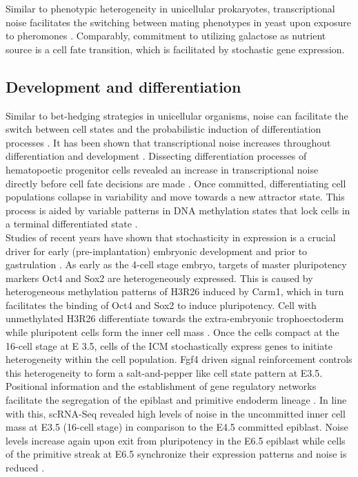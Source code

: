 Similar to phenotypic heterogeneity in unicellular prokaryotes, transcriptional noise facilitates the switching between mating phenotypes in yeast upon exposure to pheromones \citep{Paliwal2007}. Comparably, commitment to utilizing galactose as nutrient source is a cell fate transition, which is facilitated by stochastic gene expression\cite{Acar2008}. \\ 

\newpage

\subsection{Development and differentiation}

Similar to bet-hedging strategies in unicellular organisms, noise can facilitate the switch between cell states and the probabilistic induction of differentiation processes \citep{Eldar2010, Chang2008}. It has been shown that transcriptional noise increases throughout differentiation \citep{Stumpf2017} and development \citep{Antolovic2017}. Dissecting differentiation processes of hematopoetic progenitor cells revealed an increase in transcriptional noise directly before cell fate decisions are made \citep{Mojtahedi2016, Richard2016}. Once committed, differentiating cell populations collapse in variability and move towards a new attractor state. This process is aided by variable patterns in DNA methylation states that lock cells in a terminal differentiated state \citep{Jenkinson2017}. \\

Studies of recent years have shown that stochasticity in expression is a crucial driver for early (pre-implantation) embryonic development and prior to gastrulation \citep{Dietrich2007}. As early as the 4-cell stage embryo, targets of master pluripotency markers \Gls{Oct4} and \Gls{Sox2} are heterogeneously expressed.  This is caused by heterogeneous methylation patterns of \Gls{H3R26} induced by \Gls{Carm1}, which in turn facilitates the binding of Oct4 and Sox2 to induce pluripotency. Cell with unmethylated H3R26 differentiate towards the extra-embryonic trophoectoderm while pluripotent cells form the inner cell mass \citep{Goolam2016}. Once the cells compact at the 16-cell stage at \Gls{E} 3.5, cells of the \gls{ICM} stochastically express genes to initiate heterogeneity within the cell population. Fgf4 driven signal reinforcement controls this heterogeneity to form a salt-and-pepper like cell state pattern at E3.5. Positional information and the establishment of gene regulatory networks facilitate the segregation of the epiblast and primitive endoderm lineage \citep{Ohnishi2014}. In line with this, scRNA-Seq revealed high levels of noise in the uncommitted inner cell mass at E3.5 (16-cell stage) in comparison to the E4.5 committed epiblast. Noise levels increase again upon exit from pluripotency in the E6.5 epiblast while cells of the primitive streak at E6.5 synchronize their expression patterns and noise is reduced \citep{Mohammed2017}.\\

